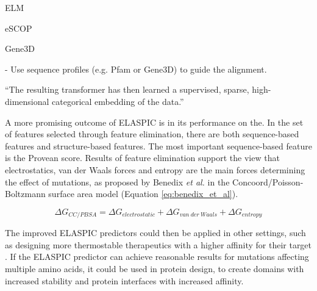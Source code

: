 
ELM




eSCOP

Gene3D

- Use sequence profiles (e.g. Pfam or Gene3D) to guide the alignment.

``The resulting transformer has then learned a supervised, sparse, high-dimensional categorical embedding of the data.''



A more promising outcome of ELASPIC is in its performance on the. In the set of features selected through feature elimination, there are both sequence-based features and structure-based features. The most important sequence-based feature is the Provean score. Results of feature elimination support the view that electrostatics, van der Waals forces and entropy are the main forces determining the effect of mutations, as proposed by Benedix \textit{et al.} in the Concoord/Poisson-Boltzmann surface area model (Equation \ref{eq:benedix_et_al}).

\begin{equation} \label{eq:benedix_et_al}
    \Delta G_{CC/PBSA} = \Delta G_{electrostatic} + \Delta G_{van\ der\ Waals} + \Delta G_{entropy}
\end{equation}



The improved ELASPIC predictors could then be applied in other settings, such as designing more thermostable therapeutics with a higher affinity for their target \cite{seeliger_protein_2010,bednar_fireprot:_2015}. If the ELASPIC predictor can achieve reasonable results for mutations affecting multiple amino acids, it could be used in protein design, to create domains with increased stability and protein interfaces with increased affinity.



